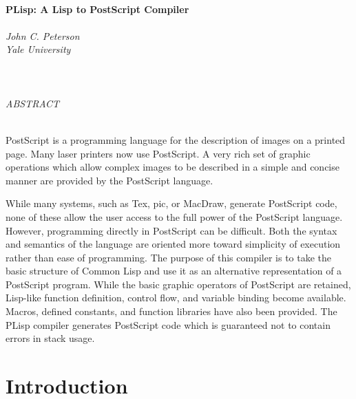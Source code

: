 \setlength{\oddsidemargin}{.4in}
\setlength{\evensidemargin}{.4in}
\setlength{\textwidth}{6in}
\setlength{\parindent}{0in}
\setlength{\parskip}{0.15in}
\setcounter{page}{-1}


\newcommand{\com}[2]
    {\item[{\tt #1 \hfill} ] #2}
\newcommand{\err}[2]
    {\par {\tt \bf #1 \\} #2 }

\begin{center}
\ \\
{\bf
PLisp: A Lisp to PostScript Compiler}\\
\ \\
{\it John C. Peterson}\\
{\it Yale University}\\
\ \\
\ \\
\ \\
\vspace{1in}
{\it ABSTRACT}\\
\ \\
\end{center}

PostScript is a programming language for the description
of images on a printed page.  Many laser printers now use PostScript.
A very rich set of
graphic operations which allow complex images to be described in a
simple and concise manner are provided by the PostScript language.

While many systems, such as Tex, pic, or MacDraw, 
generate PostScript code, none of these allow the
user access to the full power of the PostScript language.
However, programming directly in PostScript can be difficult.  Both
the syntax and semantics of the language are 
oriented more toward simplicity of execution rather than ease of
programming.
The purpose of this compiler is to take the basic structure of Common Lisp
and use it as an alternative representation of a PostScript program.
While the basic graphic operators of PostScript are retained,
Lisp-like function definition, control flow, and variable binding
become available.  Macros,
defined constants, and function libraries have also  been provided.
The PLisp compiler generates PostScript code which is guaranteed not
to contain errors in stack usage.

\newpage
\section{Introduction}


